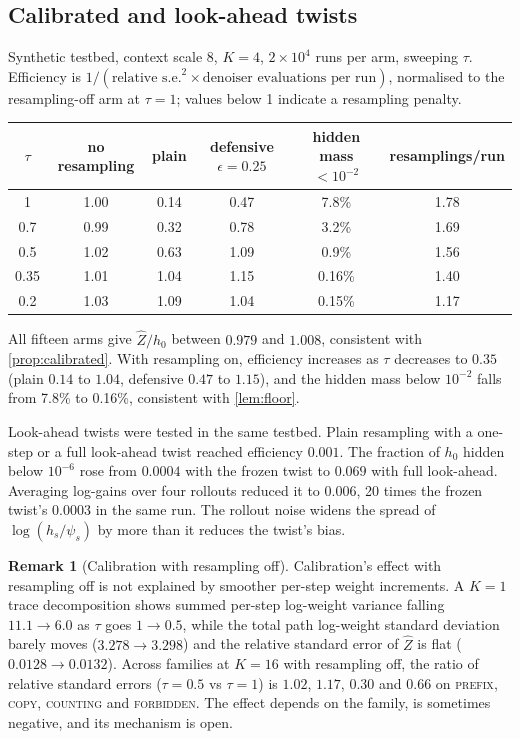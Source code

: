 \documentclass[11pt]{article}
\theoremstyle{definition}
\newtheorem{remark}[theorem]{Remark}
\newcommand{\Zh}{\widehat Z}
\begin{document}
\subsection{Calibrated and look-ahead twists}\label{sec:expcal}
Synthetic testbed, context scale 8, $K=4$, $2\times10^4$ runs per arm, sweeping $\tau$. Efficiency is
$1/(\text{relative s.e.}^2\times\text{denoiser evaluations per run})$, normalised to the resampling-off arm at
$\tau=1$; values below 1 indicate a resampling penalty.

\begin{center}\small
\begin{tabular}{cccccc}
\toprule
$\tau$ & no resampling & plain & defensive $\epsilon=0.25$ & hidden mass $<10^{-2}$ & resamplings/run \\
\midrule
1    & 1.00 & 0.14 & 0.47 & 7.8\%  & 1.78\\
0.7  & 0.99 & 0.32 & 0.78 & 3.2\%  & 1.69\\
0.5  & 1.02 & 0.63 & 1.09 & 0.9\%  & 1.56\\
0.35 & 1.01 & 1.04 & 1.15 & 0.16\% & 1.40\\
0.2  & 1.03 & 1.09 & 1.04 & 0.15\% & 1.17\\
\bottomrule
\end{tabular}
\end{center}

All fifteen arms give $\Zh/h_0$ between $0.979$ and $1.008$, consistent with \cref{prop:calibrated}. With
resampling on, efficiency increases as $\tau$ decreases to $0.35$ (plain $0.14$ to $1.04$, defensive $0.47$ to
$1.15$), and the hidden mass below $10^{-2}$ falls from 7.8\% to 0.16\%, consistent with \cref{lem:floor}.

Look-ahead twists were tested in the same testbed. Plain resampling with a one-step or a full look-ahead twist
reached efficiency $0.001$. The fraction of $h_0$ hidden below $10^{-6}$ rose from $0.0004$ with the frozen twist
to $0.069$ with full look-ahead. Averaging log-gains over four rollouts reduced it to $0.006$, 20 times the frozen
twist's $0.0003$ in the same run. The rollout noise widens the spread of $\log(h_s/\psi_s)$ by more than it
reduces the twist's bias.

\begin{remark}[Calibration with resampling off]
Calibration's effect with resampling off is not explained by smoother per-step weight increments. A $K=1$ trace
decomposition shows summed per-step log-weight variance falling $11.1\to6.0$ as $\tau$ goes $1\to0.5$, while the
total path log-weight standard deviation barely moves ($3.278\to3.298$) and the relative standard error of $\Zh$
is flat ($0.0128\to0.0132$). Across families at $K=16$ with resampling off, the ratio of relative standard errors
($\tau=0.5$ vs $\tau=1$) is $1.02$, $1.17$, $0.30$ and $0.66$ on \textsc{prefix}, \textsc{copy},
\textsc{counting} and \textsc{forbidden}. The effect depends on the family, is sometimes negative, and its
mechanism is open.
\end{remark}
\end{document}
